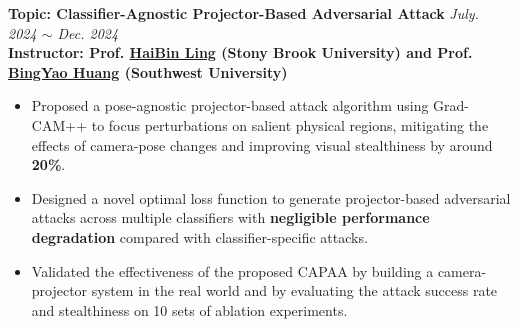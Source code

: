 \documentclass{article}
\begin{document}
\vspace{-10pt}
\noindent \textbf{Topic: Classifier-Agnostic Projector-Based Adversarial Attack} \hfill \emph{July. 2024 $\sim$ Dec. 2024} \\
\textbf{Instructor: Prof. \href{https://www3.cs.stonybrook.edu/~hling/}{\color{blue} HaiBin Ling} (Stony Brook University) and Prof. \href{https://bingyaohuang.github.io/}{\color{blue} BingYao Huang} (Southwest University)}
\begin{itemize}[noitemsep,nolistsep,leftmargin=*]
\item Proposed a pose-agnostic projector-based attack algorithm using Grad-CAM++ to focus perturbations on salient physical regions, mitigating the effects of camera-pose changes and improving visual stealthiness by around \textbf{20\%}.
\item Designed a novel optimal loss function to generate projector-based adversarial attacks across multiple classifiers with \textbf{negligible performance degradation} compared with classifier-specific attacks.
\item Validated the effectiveness of the proposed CAPAA by building a camera-projector system in the real world and by evaluating the attack success rate and stealthiness on 10 sets of ablation experiments.
\end{itemize}
\vspace{2pt}
\end{document}
